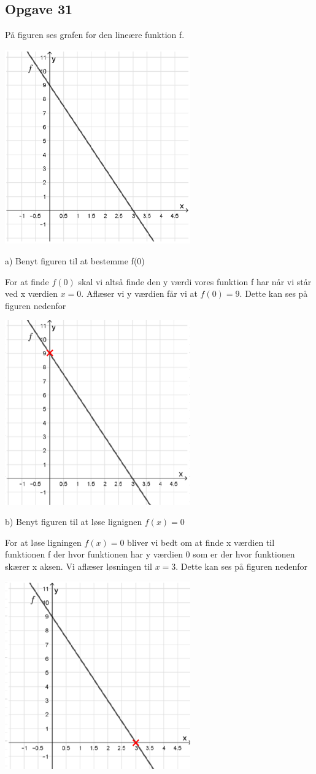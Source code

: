 \subsection{Opgave 31}

På figuren ses grafen for den lineære funktion f.

\includegraphics[width=8cm]{Opgave_31-40/Opgave_31/31.png}

a) Benyt figuren til at bestemme f(0)

\ans

For at finde $f(0)$ skal vi altså finde den y værdi vores funktion f har når 
vi står ved x værdien $x = 0$. Aflæser vi y værdien får vi at $f(0) = 9$.
Dette kan ses på figuren nedenfor

\includegraphics[width=8cm]{Opgave_31-40/Opgave_31/31.1.png}


b) Benyt figuren til at løse lignignen $f(x) = 0$

\ans

For at løse ligningen $f(x) = 0$ bliver vi bedt om at finde x værdien til funktionen f 
der hvor funktionen har y værdien 0 som er der hvor funktionen skærer x aksen.
Vi aflæser løsningen til $x = 3$.
Dette kan ses på figuren nedenfor

\includegraphics[width=8cm]{Opgave_31-40/Opgave_31/31.2.png}